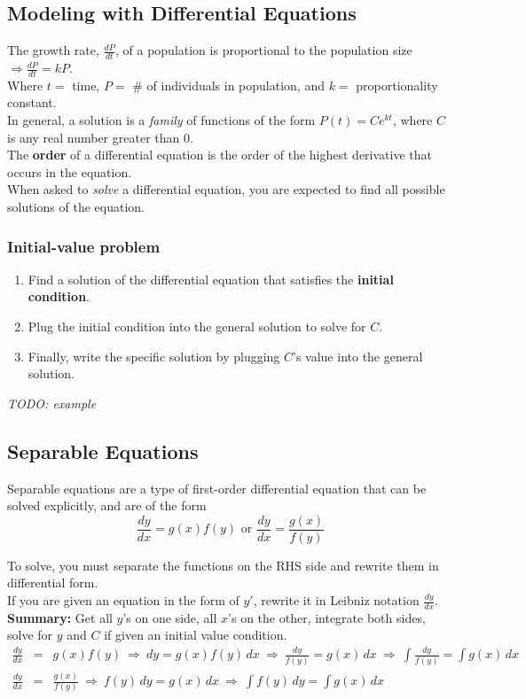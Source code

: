 \documentclass[8pt,letterpaper]{article}
\begin{document}
\subsection*{Modeling with Differential Equations} %
The growth rate, $\frac{dP}{dt}$, of a population is proportional to the population size
$\Rightarrow \frac{dP}{dt} = kP$. \\
Where $t=$ time, $P=$ \# of individuals in population, and $k=$ proportionality constant.\\
In general, a solution is a \emph{family} of functions of the form $P(t) = C e^{kt}$,
where $C$ is any real number greater than 0. \\
The \textbf{order} of a differential equation is the order of the highest
derivative that occurs in the equation.\\
When asked to \emph{solve} a differential equation, you are expected to find all possible
solutions of the equation.
\\
\subsubsection*{Initial-value problem}
\begin{enumerate}
\item Find a solution of the differential equation that satisfies the \textbf{initial condition}.
\item Plug the initial condition into the general solution to solve for $C$.
\item Finally, write the specific solution by plugging $C$'s value into the general solution.
\end{enumerate}

\emph{TODO: example}


\subsection*{Separable Equations} %
Separable equations are a type of first-order differential equation that can be solved explicitly,
and are of the form
\begin{equation*}
\frac{dy}{dx} = g(x)f(y)
\mbox{  or  }
\frac{dy}{dx} = \frac{g(x)}{f(y)}
\end{equation*}

\noindent To solve, you must separate the functions on the RHS side and rewrite them in differential form.
\\If you are given an equation in the form of $y'$, rewrite it in Leibniz notation $\frac{dy}{dx}$.\\
\textbf{Summary:} Get all $y$'s on one side, all $x$'s on the other, integrate both sides, 
solve for $y$ and $C$ if given an initial value condition.
\begin{eqnarray*}
\frac{dy}{dx} &=& g(x)f(y) \: \Rightarrow \:
dy = g(x)f(y)\,dx \: \Rightarrow \:
\frac{dy}{f(y)} = g(x)\,dx \: \Rightarrow \:
\int \frac{dy}{f(y)} = \int g(x)\,dx
\\
\frac{dy}{dx} &=& \frac{g(x)}{f(y)} \: \Rightarrow \:
f(y)\,dy = g(x)\,dx \: \Rightarrow \:
\int f(y)\,dy = \int g(x)\,dx
\end{eqnarray*}
\end{document}
